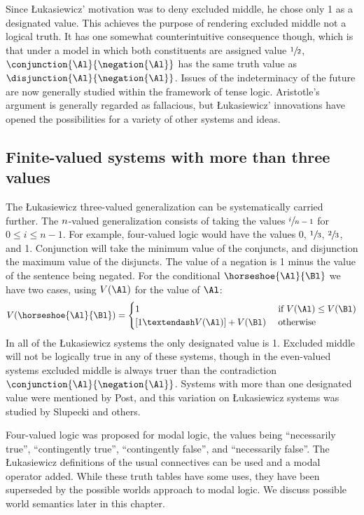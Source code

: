 Since \L{}ukasiewicz' motivation was to deny excluded middle, he chose only 1 as a designated value. 
This achieves the purpose of rendering excluded middle not a logical truth. 
It has one somewhat counterintuitive consequence though, which is that under a model in which both constituents are assigned value $\sfrac{1}{2}$, $\conjunction{\Al}{\negation{\Al}}$ has the same truth value as $\disjunction{\Al}{\negation{\Al}}$. 
Issues of the indeterminacy of the future are now generally studied within the framework of tense logic. 
Aristotle's argument is generally regarded as fallacious, but \L{}ukasiewicz' innovations have opened the possibilities for a variety of other systems and ideas. 

\subsection{Finite-valued systems with more than three values}

The \L{}ukasiewicz three-valued generalization can be systematically carried further. 
The $n$-valued generalization consists of taking the values $\sfrac{i}{n-1}$ for $0 \leq i \leq n-1$. 
For example, four-valued logic would have the values 0, $\sfrac{1}{3}$, $\sfrac{2}{3}$, and 1. 
Conjunction will take the minimum value of the conjuncts, and disjunction the maximum value of the disjuncts. 
The value of a negation is 1 minus the value of the sentence being negated. 
For the conditional $\horseshoe{\Al}{\Bl}$ we have two cases, using $V(\Al)$ for the value of $\Al$:
\[V(\horseshoe{\Al}{\Bl}) = 
\begin{cases}
1 & \text{ if } V(\Al) \leq V(\Bl) \\
[1 – V(\Al)]  + V($\Bl$) & \text{ otherwise}
\end{cases}\]
In all of the \L{}ukasiewicz systems the only designated value is 1. 
Excluded middle will not be logically true in any of these systems, though in the even-valued systems excluded middle is always truer than the contradiction $\conjunction{\Al}{\negation{\Al}}$. 
Systems with more than one designated value were mentioned by Post, and this variation on \L{}ukasiewicz systems was studied by Slupecki and others. 

Four-valued logic was proposed for modal logic, the values being ``necessarily true'', ``contingently true'', ``contingently false'', and ``necessarily false''.
The \L{}ukasiewicz definitions of the usual connectives can be used and a modal operator added. 
While these truth tables have some uses, they have been superseded by the possible worlds approach to modal logic. We discuss possible world semantics later in this chapter.

